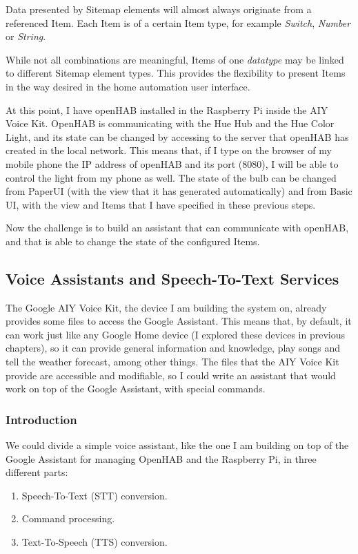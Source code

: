 Data presented by Sitemap elements will almost always originate from a referenced Item. Each Item is of a certain Item type, for 
example \textit{Switch}, \textit{Number} or \textit{String}.

While not all combinations are meaningful, Items of one \textit{datatype} may be linked to different Sitemap element types. This 
provides the flexibility to present Items in the way desired in the home automation user interface.

\bigskip
At this point, I have openHAB installed in the Raspberry Pi inside the AIY Voice Kit. OpenHAB is communicating with the Hue Hub and
the Hue Color Light, and its state can be changed by accessing to the server that openHAB has created in the local network. This means
that, if I type on the browser of my mobile phone the IP address of openHAB and its port (8080), I will be able to control the light from
my phone as well. The state of the bulb can be changed from PaperUI (with the view that it has generated automatically) and from 
Basic UI, with the view and Items that I have specified in these previous steps.

Now the challenge is to build an assistant that can communicate with openHAB, and that is able to change the state of the configured
Items.

\subsection{Voice Assistants and Speech-To-Text Services}
The Google AIY Voice Kit, the device I am building the system on, already provides some files to access the Google Assistant. This
means that, by default, it can work just like any Google Home device (I explored these devices in previous chapters), so it can
provide general information and knowledge, play songs and tell the weather forecast, among other things. The files that the AIY Voice
Kit provide are accessible and modifiable, so I could write an assistant that would work on top of the Google Assistant, with special
commands.

\subsubsection{Introduction}
We could divide a simple voice assistant, like the one I am building on top of the Google Assistant for managing OpenHAB and the 
Raspberry Pi, in three different parts:
\begin{enumerate}
    \item Speech-To-Text (STT) conversion.
    \item Command processing.
    \item Text-To-Speech (TTS) conversion.
\end{enumerate}


